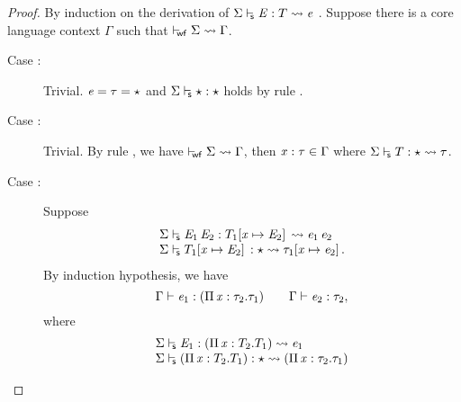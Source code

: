 \begin{proof}
    By induction on the derivation of $ \Sigma  \vdash_{\!\!\mathsf{s} }  \mathit{E}  :  T   \rightsquigarrow   \mathit{e} $ . Suppose there is
a core language context $\Gamma$ such that $ \vdash_{\!\!\mathsf{wf} }  \Sigma   \rightsquigarrow   \Gamma $.
    \begin{description}
        \item[Case :] Trivial. $\mathit{e} = \tau = \star$ and
$ \Sigma  \vdash_{\!\!\mathsf{s} }  \star  :  \star $ holds by rule .
        \item[Case :] Trivial. By rule , we
have $ \vdash_{\!\!\mathsf{wf} }  \Sigma   \rightsquigarrow   \Gamma $, then $\mathit{x}:\tau  \in  \Gamma$ where $ \Sigma  \vdash_{\!\!\mathsf{s} }  T  :  \star   \rightsquigarrow   \tau $.
        \item[Case :] Suppose
            \[\begin{array}{l}
             \Sigma  \vdash_{\!\!\mathsf{s} }  \mathit{E_{{\mathrm{1}}}} \, \mathit{E_{{\mathrm{2}}}}  :  T_{{\mathrm{1}}}  [  \mathit{x}  \mapsto  \mathit{E_{{\mathrm{2}}}}  ] \,   \rightsquigarrow   \mathit{e_{{\mathrm{1}}}} \, \mathit{e_{{\mathrm{2}}}}  \\
             \Sigma  \vdash_{\!\!\mathsf{s} }  T_{{\mathrm{1}}}  [  \mathit{x}  \mapsto  \mathit{E_{{\mathrm{2}}}}  ] \,  :  \star   \rightsquigarrow   \tau_{{\mathrm{1}}}  [  \mathit{x}  \mapsto  \mathit{e_{{\mathrm{2}}}}  ] \, .
            \end{array} \]
            By induction
            hypothesis, we have 
            \[
            \Gamma  \vdash  \mathit{e_{{\mathrm{1}}}}  :  (  \Pi \, \mathit{x}  :  \tau_{{\mathrm{2}}}  .  \tau_{{\mathrm{1}}}  ) \qquad
            \Gamma  \vdash  \mathit{e_{{\mathrm{2}}}}  :  \tau_{{\mathrm{2}}},
            \]
            where
            \[\begin{array}{l}
              \Sigma  \vdash_{\!\!\mathsf{s} }  \mathit{E_{{\mathrm{1}}}}  :  (  \Pi \, \mathit{x}  :  T_{{\mathrm{2}}}  .  T_{{\mathrm{1}}}  )   \rightsquigarrow   \mathit{e_{{\mathrm{1}}}}  \\
               \Sigma  \vdash_{\!\!\mathsf{s} }  (  \Pi \, \mathit{x}  :  T_{{\mathrm{2}}}  .  T_{{\mathrm{1}}}  )  :  \star   \rightsquigarrow   (  \Pi \, \mathit{x}  :  \tau_{{\mathrm{2}}}  .  \tau_{{\mathrm{1}}}  )  \\

\end{array}\]
\end{description}
\end{proof}

